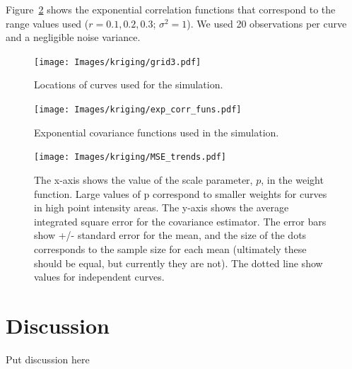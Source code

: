Figure~\ref{fig:exp_corr_funs} shows the exponential correlation functions that correspond to the range values used ($r = 0.1, 0.2, 0.3$; $\sigma^2=1$). We used 20 observations per curve and a negligible noise variance. 

\begin{figure}
	\begin{center}
		\texttt{[image: Images/kriging/grid3.pdf]} 
	\end{center}
	\caption{Locations of curves used for the simulation.} \label{fig:grid3} 
\end{figure}

\begin{figure}
	\begin{center}
		\texttt{[image: Images/kriging/exp\_corr\_funs.pdf]} 
	\end{center}
	\caption{Exponential covariance functions used in the simulation.} \label{fig:exp_corr_funs} 
\end{figure}

\begin{figure}
	\begin{center}
		\texttt{[image: Images/kriging/MSE\_trends.pdf]} 
	\end{center}
	\caption{The x-axis shows the value of the scale parameter, $p$, in the weight function. Large values of p correspond to smaller weights for curves in high point intensity areas. The y-axis shows the average integrated square error for the covariance estimator. The error bars show +/- standard error for the mean, and the size of the dots corresponds to the sample size for each mean (ultimately these should be equal, but currently they are not). The dotted line show values for independent curves.} \label{fig:MSE_trends} 
\end{figure}

\section{Discussion} %
\label{sec:discussion}
Put discussion here

